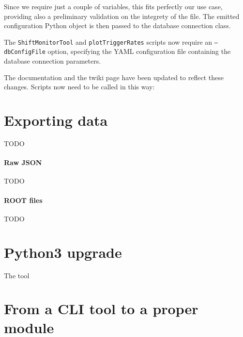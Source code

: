 Since we require just a couple of variables, this fits perfectly our use case, providing also a preliminary validation on the integrety of the file. The emitted configuration Python object is then passed to the database connection class.

The \texttt{ShiftMonitorTool} and \texttt{plotTriggerRates} scripts now require an \texttt{--dbConfigFile} option, specifying the YAML configuration file containing the database connection parameters.

The documentation and the twiki page have been updated to reflect these changes. Scripts now need to be called in this way:


\section{Exporting data}

TODO

\paragraph{Raw JSON}

TODO

\paragraph{ROOT files}

TODO

\section{Python3 upgrade}

The tool 

\section{From a CLI tool to a proper module}

